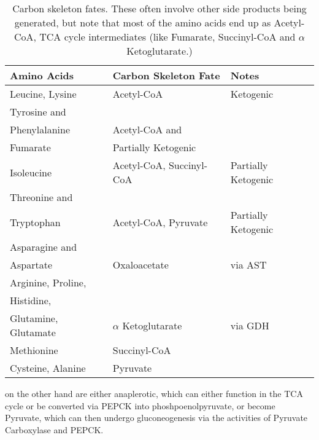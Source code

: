 \documentclass{tufte-handout}
\begin{document}
\begin{table}[]
\centering
\caption{Carbon skeleton fates.  These often involve other side products being generated, but note that most of the amino acids end up as Acetyl-CoA, TCA cycle intermediates (like Fumarate, Succinyl-CoA and $\alpha$ Ketoglutarate.)}
\label{tab:carbon-skeletons}
\begin{tabular}{lll}
\textbf{Amino Acids}                                        & \textbf{Carbon Skeleton Fate}        & \textbf{Notes}                 \\ \hline
Leucine, Lysine                                    & Acetyl-CoA                  & Ketogenic  \\ \hline
Tyrosine and\\ Phenylalanine                         & Acetyl-CoA and\\ Fumarate     & Partially Ketogenic   \\ \hline
Isoleucine                                         & Acetyl-CoA, Succinyl-CoA & Partially Ketogenic   \\ \hline
Threonine and\\ Tryptophan                           & Acetyl-CoA, Pyruvate     & Partially Ketogenic   \\ \hline
Asparagine and\\ Aspartate                           & Oxaloacetate                & via AST               \\ \hline
Arginine, Proline,\\ Histidine,\\ Glutamine, Glutamate & $\alpha$ Ketoglutarate      & via GDH               \\ \hline
Methionine                                         & Succinyl-CoA                &                       \\ \hline
Cysteine, Alanine                                  & Pyruvate                    &                      
\end{tabular}
\end{table}

 on the other hand are either anaplerotic, which can either function in the TCA cycle or be converted via PEPCK into phoshpoenolpyruvate, or become Pyruvate, which can then undergo gluconeogenesis via the activities of Pyruvate Carboxylase and PEPCK.



\end{document}
